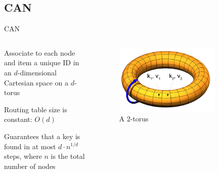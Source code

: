 
\subsection{CAN}

\begin{frame}{CAN}

\begin{columns}
\begin{column}{0.5\textwidth}
\BI
\item Associate to each node and item a unique ID in an $d$-dimensional Cartesian space on a $d$-torus
\item Routing table size is \alert{constant: $O(d)$}
\item Guarantees that a key is found in at most $d \cdot n^{1/d}$ steps, where $n$ is the total number of nodes	
\EI
\end{column}
\begin{column}{0.5\textwidth}
\begin{figure}
	\includegraphics[width=0.8\textwidth]{figs/10/can-torus}
	\caption{A $2$-torus}
\end{figure}
\end{column}
\end{columns}

\begin{Bib}
{\scriptsize
}
\end{Bib}

\end{frame}

